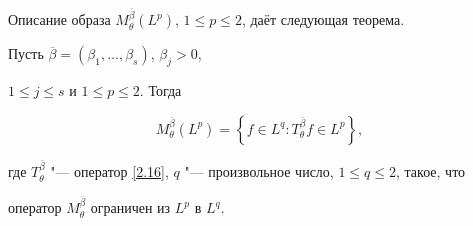 \smallskip



Описание образа $M_\theta^{\overline{\beta}}(L^p)$, $1\leq p\leq 2$, даёт следующая теорема.

\smallskip

\begin{theorem}[4]Пусть ${\overline{\beta}}=(\beta_1,\ldots,\beta_s)${\rm ,} $\beta_j>0${\rm ,}

$1\leq j\leq s$ и $1\leq p\leq 2${\rm .} Тогда

$$\label{2.21}

    M_\theta^{\overline{\beta}}(L^p)=\left\{f\in L^q: T_\theta^{\overline{\beta}} f\in

    L^p\right\},$$

где $T_\theta^{\overline{\beta}}$ "--- оператор \eqref{2.16}{\rm ,} $q$ "--- произвольное число{\rm ,}  $1\leq q\leq 2${\rm ,} такое{\rm ,} что

оператор $M_\theta^{\overline{\beta}}$ ограничен из $L^p$ в $L^q${\rm .}

\end{theorem}



